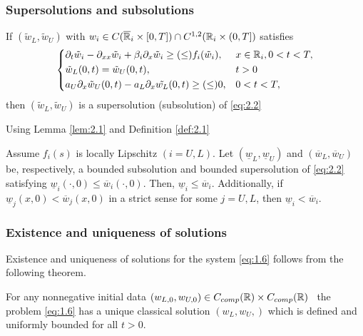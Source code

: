 \begin{frame}[allowframebreaks]
    \frametitle{Supersolutions and subsolutions}
    \begin{definition}
        If \((\tilde{w}_L, \tilde{w}_{U})\) with \(w_i \in C(\overline{\mathbb{R}}_i \times [0, T]) \cap C^{1,2}(\mathbb{R}_i \times (0, T])\) satisfies 
        \begin{equation}
            \begin{dcases}
                \partial_t \tilde{w}_i - \partial_{xx} \tilde{w}_i + \beta_i \partial_x \tilde{w}_i \geq (\leq) f_i(\tilde{w}_i), & x \in \mathbb{R}_i, 0 < t < T, \\
                \tilde{w}_L(0, t) = \tilde{w}_{U}(0, t), & t > 0 \\
                    a_{U} \partial_x \tilde{w}_{U}(0, t) - a_L \partial_x \tilde{w_L}(0, t) \geq (\leq) 0, & 0 < t < T, \\
            \end{dcases}
            \label{eq:2.2}
        \end{equation}
        then \((\tilde{w}_L, \tilde{w}_{U})\) is a supersolution (subsolution) of \ref{eq:2.2}
        \label{def:2.1}
    \end{definition}
    \framebreak
    Using Lemma \ref{lem:2.1} and Definition \ref{def:2.1}
    \begin{lemma}
        Assume \(f_i(s)\) is locally Lipschitz \((i = U, L)\). Let \((\underline{w}_L, \underline{w}_{U})\) and \((\overline{w}_L, \overline{w}_{U})\) be, respectively, a bounded subsolution and bounded supersolution of \ref{eq:2.2} satisfying \(\underline{w}_i(\cdot, 0) \leq \overline{w}_i(\cdot, 0)\). Then, \(\underline{w}_i \leq \overline{w}_i\). Additionally, if \(\underline{w}_j(x,0) < \overline{w}_j(x,0)\) in a strict sense for some \(j = U, L\), then \(\underline{w}_i < \overline{w}_i\).
        \label{lem:2.2} 
    \end{lemma}
\end{frame}


\begin{frame}
    \frametitle{Existence and uniqueness of solutions}
    Existence and uniqueness of solutions for the system \ref{eq:1.6} follows from the following theorem.
    \begin{theorem}
        For any nonnegative initial data \((w_{L,0}, w_{U,0}) \in C_{comp}(\mathbb{R}) \times C_{comp}(\mathbb{R}) \) \, the problem \eqref{eq:1.6} has a unique classical solution \((w_L, w_{U},)\) which is defined and uniformly bounded for all \(t > 0\).
        \label{thm:2.4}
    \end{theorem}
\end{frame}

